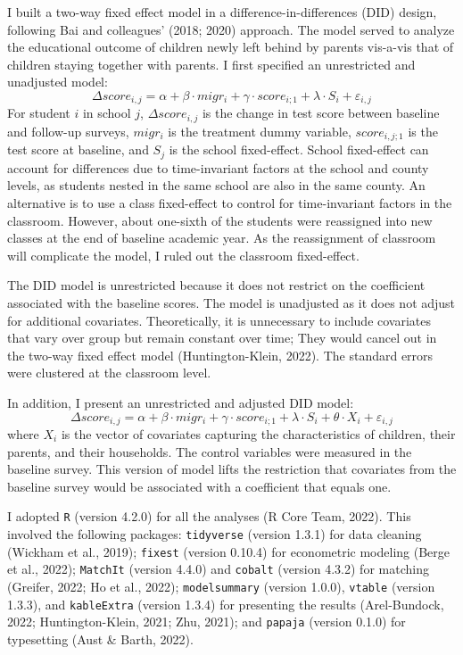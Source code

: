 \documentclass[
  man,floatsintext]{apa7}
\begin{document}
I built a two-way fixed effect model in a difference-in-differences (DID) design, following Bai and colleagues' (2018; 2020) approach. The model served to analyze the educational outcome of children newly left behind by parents vis-a-vis that of children staying together with parents. I first specified an unrestricted and unadjusted model: \[\Delta score_{i,j} = \alpha + \beta \cdot migr_{i} + \gamma \cdot score_{i;1} + \lambda \cdot S_{i} + \varepsilon_{i,j}\] For student \(i\) in school \(j\), \(\Delta score_{i,j}\) is the change in test score between baseline and follow-up surveys, \(migr_{i}\) is the treatment dummy variable, \(score_{i,j;1}\) is the test score at baseline, and \(S_{j}\) is the school fixed-effect. School fixed-effect can account for differences due to time-invariant factors at the school and county levels, as students nested in the same school are also in the same county. An alternative is to use a class fixed-effect to control for time-invariant factors in the classroom. However, about one-sixth of the students were reassigned into new classes at the end of baseline academic year. As the reassignment of classroom will complicate the model, I ruled out the classroom fixed-effect.

The DID model is unrestricted because it does not restrict on the coefficient associated with the baseline scores. The model is unadjusted as it does not adjust for additional covariates. Theoretically, it is unnecessary to include covariates that vary over group but remain constant over time; They would cancel out in the two-way fixed effect model (Huntington-Klein, 2022). The standard errors were clustered at the classroom level.

In addition, I present an unrestricted and adjusted DID model: \[\Delta score_{i,j} = \alpha + \beta \cdot migr_{i} + \gamma \cdot score_{i;1} + \lambda \cdot S_{i} + \theta \cdot X_{i} + \varepsilon_{i,j}\] where \(X_{i}\) is the vector of covariates capturing the characteristics of children, their parents, and their households. The control variables were measured in the baseline survey. This version of model lifts the restriction that covariates from the baseline survey would be associated with a coefficient that equals one.

I adopted \texttt{R} (version 4.2.0) for all the analyses (R Core Team, 2022). This involved the following packages: \texttt{tidyverse} (version 1.3.1) for data cleaning (Wickham et al., 2019); \texttt{fixest} (version 0.10.4) for econometric modeling (Berge et al., 2022); \texttt{MatchIt} (version 4.4.0) and \texttt{cobalt} (version 4.3.2) for matching (Greifer, 2022; Ho et al., 2022); \texttt{modelsummary} (version 1.0.0), \texttt{vtable} (version 1.3.3), and \texttt{kableExtra} (version 1.3.4) for presenting the results (Arel-Bundock, 2022; Huntington-Klein, 2021; Zhu, 2021); and \texttt{papaja} (version 0.1.0) for typesetting (Aust \& Barth, 2022).
\end{document}
